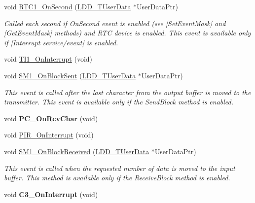 \begin{DoxyCompactItemize}
\item 
void \hyperlink{group___events__module_ga2f94110e651cb30cba928647e91e92d4}{R\-T\-C1\-\_\-\-On\-Second} (\hyperlink{group___p_e___types__module_ga0b66a73f87238a782318aa0be7578e35}{L\-D\-D\-\_\-\-T\-User\-Data} $\ast$User\-Data\-Ptr)
\begin{DoxyCompactList}\small\item\em Called each second if On\-Second event is enabled (see \mbox{[}Set\-Event\-Mask\mbox{]} and \mbox{[}Get\-Event\-Mask\mbox{]} methods) and R\-T\-C device is enabled. This event is available only if \mbox{[}Interrupt service/event\mbox{]} is enabled. \end{DoxyCompactList}\item 
void \hyperlink{group___events__module_ga01b566cf25a21b34152513dcb1321a11}{T\-I1\-\_\-\-On\-Interrupt} (void)
\item 
void \hyperlink{group___events__module_ga418ede37c26c8d7e8e073dfb0ac0f0f1}{S\-M1\-\_\-\-On\-Block\-Sent} (\hyperlink{group___p_e___types__module_ga0b66a73f87238a782318aa0be7578e35}{L\-D\-D\-\_\-\-T\-User\-Data} $\ast$User\-Data\-Ptr)
\begin{DoxyCompactList}\small\item\em This event is called after the last character from the output buffer is moved to the transmitter. This event is available only if the Send\-Block method is enabled. \end{DoxyCompactList}\item 
\hypertarget{group___events__module_gaf6e288c71047c712f9a65765a3a23d68}{void {\bfseries P\-C\-\_\-\-On\-Rcv\-Char} (void)}\label{group___events__module_gaf6e288c71047c712f9a65765a3a23d68}

\item 
void \hyperlink{group___events__module_ga9b78adebab9f35150b75c4cd4e649107}{P\-I\-R\-\_\-\-On\-Interrupt} (void)
\item 
void \hyperlink{group___events__module_ga5cc6e418a623f899f4d208e64c014c7e}{S\-M1\-\_\-\-On\-Block\-Received} (\hyperlink{group___p_e___types__module_ga0b66a73f87238a782318aa0be7578e35}{L\-D\-D\-\_\-\-T\-User\-Data} $\ast$User\-Data\-Ptr)
\begin{DoxyCompactList}\small\item\em This event is called when the requested number of data is moved to the input buffer. This method is available only if the Receive\-Block method is enabled. \end{DoxyCompactList}\item 
\hypertarget{group___events__module_gad69956376a2f9c6ccb90f0b84f833c79}{void {\bfseries C3\-\_\-\-On\-Interrupt} (void)}\label{group___events__module_gad69956376a2f9c6ccb90f0b84f833c79}


\end{DoxyCompactItemize}
